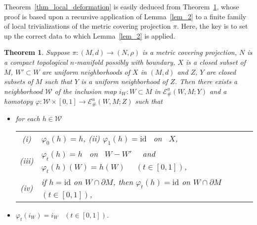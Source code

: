 \documentclass[11pt, fleqn]{amsart}
\newtheorem{theorem}{Theorem}[section]
\theoremstyle{definition}
\newcommand{\cal}{\mathcal}
\renewcommand{\phi}{\varphi}
\newcommand{\lra}{\longrightarrow}
\newcommand{\id}{\mathrm{id}}
\newcommand{\E}{\mathcal E}
\newcommand{\W}{\mathcal W}
\begin{document}
Theorem~\ref{thm_local_deformation} is easily deduced from Theorem~\ref{thm_local_deformation-2}, 
whose proof is based upon a recursive application of Lemma~\ref{lem_2} to a finite family of local trivializations of the metric covering projection $\pi$.  
Here, the key is to set up the correct data to which Lemma~\ref{lem_2} is applied.  

\begin{theorem}\label{thm_local_deformation-2} 
Suppose $\pi : (M, d) \to (N, \rho)$ is a metric covering projection, $N$ is a compact topological $n$-manifold possibly with boundary,  
$X$ is a closed subset of $M$, $W' \subset W$ are uniform neighborhoods of $X$ in $(M, d)$ and 
$Z$, $Y$ are closed subsets of $M$ such that $Y$ is a uniform neighborhood of $Z$. 
Then there exists a neighborhood $\W$ of the inclusion map $i_W : W \subset M$ in $\E^u_\#(W, M; Y)$ and 
a homotopy $\phi : \W \times [0,1] \lra \E^u_\#(W, M; Z)$ such that 
\begin{itemize} 
\item[(1)] for each $h \in \W$ \\ 
\begin{tabular}[t]{c@{\ \,}l}
{\rm (i)} & $\phi_0(h) = h$, \hspace{3mm} 
{\rm (ii)} $\phi_1(h) = \id$ \ on \ $X$, \\[2mm] 
{\rm (iii)} & $\phi_t(h) = h$ \ on \ $W - W'$ \ \ and \ \ $\phi_t(h)(W) = h(W)$ \ \ $(t \in [0,1])$, \\[2mm] 
{\rm (iv)} & if $h = \id$ on $W \cap \partial M$, then $\phi_t(h) = \id$ on $W \cap \partial M$ $(t \in [0,1])$, 
\end{tabular} 
\vskip 1.5mm 
\item[(2)] $\phi_t(i_W) = i_W$ \ $(t \in [0,1])$.
\end{itemize} 
\end{theorem}
\end{document}
